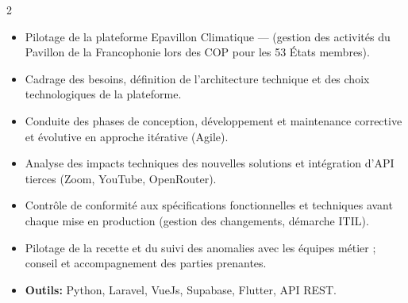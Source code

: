 \documentclass[10pt,a4paper,ragged2e,withhyper]{altacv}
\begin{document}
\begin{paracol}{2}
            \begin{itemize}
                \item Pilotage de la plateforme Epavillon Climatique —  (gestion des activités du Pavillon de la Francophonie lors des COP pour les 53 États membres).
                \item Cadrage des besoins, définition de l'architecture technique et des choix technologiques de la plateforme.
                \item Conduite des phases de conception, développement et maintenance corrective et évolutive en approche itérative (Agile).
                \item Analyse des impacts techniques des nouvelles solutions et intégration d'API tierces (Zoom, YouTube, OpenRouter).
                \item Contrôle de conformité aux spécifications fonctionnelles et techniques avant chaque mise en production (gestion des changements, démarche ITIL).
                \item Pilotage de la recette et du suivi des anomalies avec les équipes métier ; conseil et accompagnement des parties prenantes.
                \item \textcolor{SecondaryColor}{\textbf{Outils: }} Python, Laravel, VueJs, Supabase, Flutter, API REST.
            \end{itemize}
            \divider


\end{paracol}
\end{document}
